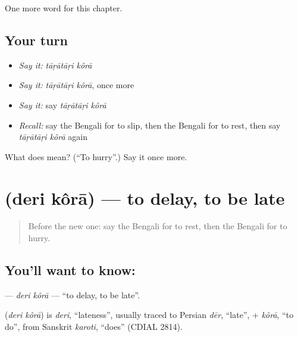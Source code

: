 \begin{grammarlens}[title={What you've built}]
One more word for this chapter.
\end{grammarlens}

\subsection*{Your turn}
\begin{itemize}
\raggedright
  \item \emph{Say it:} \emph{tāṛātāṛi kôrā}
  \item \emph{Say it:} \emph{tāṛātāṛi kôrā}, once more
  \item \emph{Say it:} say \emph{tāṛātāṛi kôrā}
  \item \emph{Recall:} say the Bengali for to slip, then the Bengali for to rest, then say \emph{tāṛātāṛi kôrā} again
\end{itemize}

\begin{tcolorbox}[breakable,colback=teal!4,colframe=teal!35!black,title={Before you move on}]
What does   mean? (\textquotedblleft{}To hurry\textquotedblright{}.) Say it once more.
\end{tcolorbox}
\section[\texorpdfstring{\bn{দেরি} \bn{করা} (deri kôrā)}{দেরি করা (deri kôrā)}]{  (deri kôrā) — to delay, to be late}

\label{lesson:BN-C149-deri-kora}



\begin{quote}
Before the new one: say the Bengali for to rest, then the Bengali for to hurry.
\end{quote}

\subsection*{You'll want to know:  }
\textbf{ } — \emph{deri kôrā} — \textquotedblleft{}to delay, to be late\textquotedblright{}.

\begin{cousinweb}
\textbf{ } (\emph{deri kôrā}) is \emph{deri}, \textquotedblleft{}lateness\textquotedblright{}, usually traced to Persian \emph{dēr}, \textquotedblleft{}late\textquotedblright{}, + \emph{kôrā}, \textquotedblleft{}to do\textquotedblright{}, from Sanskrit \emph{karoti}, \textquotedblleft{}does\textquotedblright{} (CDIAL 2814).
\end{cousinweb}

